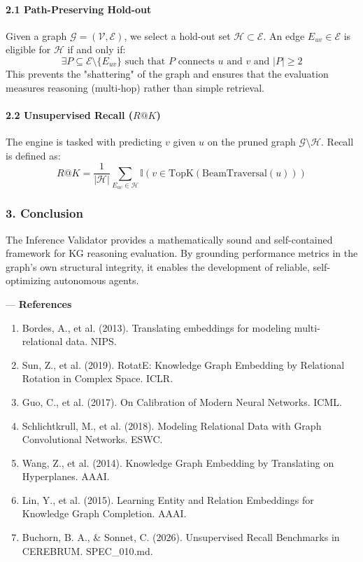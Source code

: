 \paragraph{2.1 Path-Preserving Hold-out}
Given a graph $\mathcal{G} = (\mathcal{V}, \mathcal{E})$, we select a hold-out set $\mathcal{H} \subset \mathcal{E}$. An edge $E_{uv} \in \mathcal{E}$ is eligible for $\mathcal{H}$ if and only if:
\begin{equation}
\exists P \subseteq \mathcal{E} \setminus \{E_{uv}\} \text{ such that } P \text{ connects } u \text{ and } v \text{ and } |P| \geq 2
\end{equation}
This prevents the "shattering" of the graph and ensures that the evaluation measures reasoning (multi-hop) rather than simple retrieval.

\paragraph{2.2 Unsupe\-rvised Recall ($R@K$)}
The engine is tasked with predicting $v$ given $u$ on the pruned graph $\mathcal{G} \setminus \mathcal{H}$. Recall is defined as:
\begin{equation}
R@K = \frac{1}{|\mathcal{H}|} \sum_{E_{uv} \in \mathcal{H}} \mathbb{I}(v \in \text{TopK}(\text{BeamTraversal}(u)))
\end{equation}

\subsubsection{3. Conclusion}
The Inference Validator provides a mathe\-matically sound and self-contained framework for KG reasoning evaluation. By grounding performance metrics in the graph's own structural integrity, it enables the development of reliable, self-optimizing autonomous agents.

---
\textbf{References}
\begin{enumerate}
\item Bordes, A., et al. (2013). Translating embeddings for modeling multi-relational data. NIPS.
\item Sun, Z., et al. (2019). RotatE: Knowledge Graph Embedding by Relational Rotation in Complex Space. ICLR.
\item Guo, C., et al. (2017). On Calibration of Modern Neural Networks. ICML.
\item Schlic\-htkrull, M., et al. (2018). Modeling Relational Data with Graph Convol\-utional Networks. ESWC.
\item Wang, Z., et al. (2014). Knowledge Graph Embedding by Translating on Hyperplanes. AAAI.
\item Lin, Y., et al. (2015). Learning Entity and Relation Embeddings for Knowledge Graph Completion. AAAI.
\item Buchorn, B. A., \& Sonnet, C. (2026). Unsupe\-rvised Recall Benchmarks in CEREBRUM. SPEC\_010.md.

\end{enumerate}